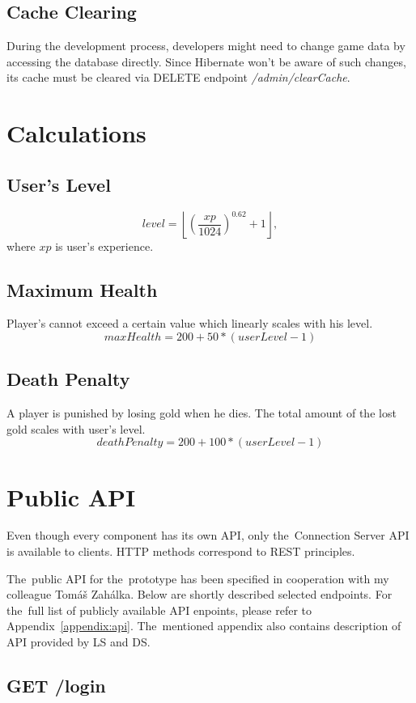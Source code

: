 	\subsection{Cache Clearing}
	During the development process, developers might need to change game data by accessing the database directly. Since Hibernate won't be aware of such changes, its cache must be cleared via DELETE endpoint \textit{/admin/clearCache}.
	
\section{Calculations}
	\subsection{User's Level}
	\[ level = \left\lfloor{\left(\frac{xp}{1024}\right)^{0.62} + 1}\right\rfloor, \]
	where $xp$ is user's experience.
	\subsection{Maximum Health}
	Player's cannot exceed a certain value which linearly scales with his level.
	\[ maxHealth = 200 + 50 * (userLevel - 1) \]
	
	\subsection{Death Penalty}
	A player is punished by losing gold when he dies. The total amount of the lost gold scales with user's level.
	\[ deathPenalty = 200 + 100 * (userLevel - 1) \]

\section{Public API}
Even though every component has its own API, only the~Connection Server API is available to clients. HTTP methods correspond to REST principles.

The~public API for the~prototype has been specified in cooperation with my colleague Tomáš Zahálka. Below are shortly described selected endpoints. For the~full list of publicly available API enpoints, please refer to Appendix~\ref{appendix:api}. The~mentioned appendix also contains description of API provided by LS and DS. 	

\subsection{GET /login}


